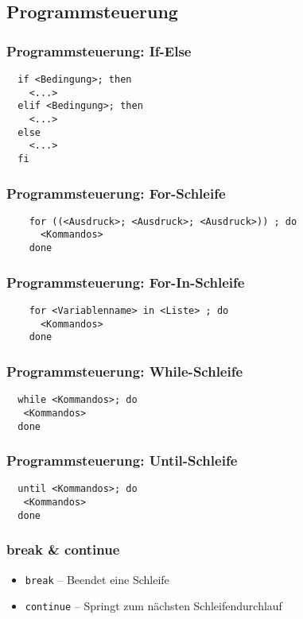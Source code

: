 \documentclass{beamer}
\begin{document}
\subsection{Programmsteuerung}
\begin{frame}[fragile]
 \frametitle{Programmsteuerung: If-Else} 
  \begin{lstlisting}
  if <Bedingung>; then
    <...>
  elif <Bedingung>; then
    <...>
  else
    <...>
  fi
  \end{lstlisting}
\end{frame}

\begin{frame}[fragile]
 \frametitle{Programmsteuerung: For-Schleife} 
   \begin{lstlisting}
    for ((<Ausdruck>; <Ausdruck>; <Ausdruck>)) ; do
      <Kommandos>
    done
  \end{lstlisting}
\end{frame}

\begin{frame}[fragile]
 \frametitle{Programmsteuerung: For-In-Schleife} 
  \begin{lstlisting}
    for <Variablenname> in <Liste> ; do
      <Kommandos>
    done
  \end{lstlisting}
\end{frame}

\begin{frame}[fragile]
 \frametitle{Programmsteuerung: While-Schleife} 
  \begin{lstlisting}
  while <Kommandos>; do
   <Kommandos>
  done
  \end{lstlisting}
\end{frame}

\begin{frame}[fragile]
 \frametitle{Programmsteuerung: Until-Schleife} 
  \begin{lstlisting}
  until <Kommandos>; do
   <Kommandos>
  done
  \end{lstlisting}
\end{frame}

\begin{frame}
 \frametitle{break \& continue}
  \begin{itemize}
   \item {\tt break} -- Beendet eine Schleife
   \item {\tt continue} -- Springt zum nächsten Schleifendurchlauf
  \end{itemize}
\end{frame}
\end{document}
